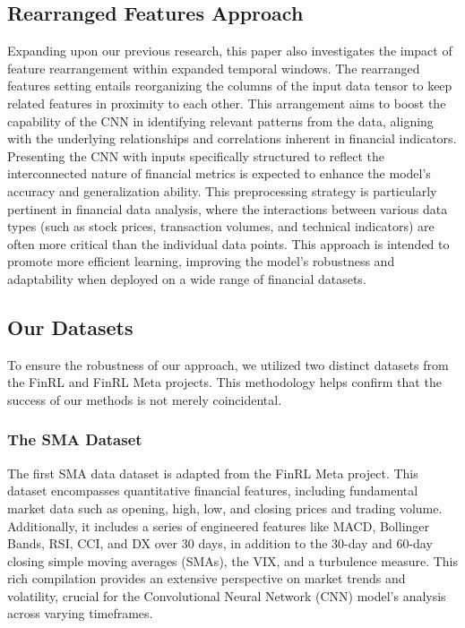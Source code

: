 \subsection{Rearranged Features Approach}

Expanding upon our previous research, this paper also investigates the impact of feature rearrangement within expanded temporal windows. The rearranged features setting entails reorganizing the columns of the input data tensor to keep related features in proximity to each other. This arrangement aims to boost the capability of the CNN in identifying relevant patterns from the data, aligning with the underlying relationships and correlations inherent in financial indicators. Presenting the CNN with inputs specifically structured to reflect the interconnected nature of financial metrics is expected to enhance the model's accuracy and generalization ability. This preprocessing strategy is particularly pertinent in financial data analysis, where the interactions between various data types (such as stock prices, transaction volumes, and technical indicators) are often more critical than the individual data points. This approach is intended to promote more efficient learning, improving the model's robustness and adaptability when deployed on a wide range of financial datasets.

\subsection{Our Datasets}

To ensure the robustness of our approach, we utilized two distinct datasets from the FinRL and FinRL Meta projects. This methodology helps confirm that the success of our methods is not merely coincidental.

\subsubsection{The SMA Dataset}

The first SMA data dataset is adapted from the FinRL Meta project. This dataset encompasses quantitative financial features, including fundamental market data such as opening, high, low, and closing prices and trading volume. Additionally, it includes a series of engineered features like MACD, Bollinger Bands, RSI, CCI, and DX over 30 days, in addition to the 30-day and 60-day closing simple moving averages (SMAs), the VIX, and a turbulence measure. This rich compilation provides an extensive perspective on market trends and volatility, crucial for the Convolutional Neural Network (CNN) model's analysis across varying timeframes.

